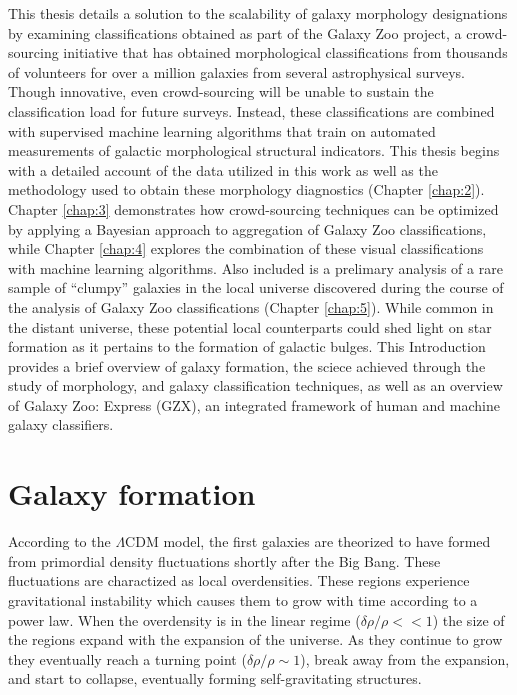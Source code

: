 This thesis details a solution to the scalability of galaxy morphology designations by examining classifications obtained as part of the Galaxy Zoo project, a crowd-sourcing initiative that has obtained morphological classifications from thousands of volunteers for over a million galaxies from several astrophysical surveys. Though innovative, even crowd-sourcing will be unable to sustain the classification load for future surveys. Instead, these classifications are combined with supervised machine learning algorithms that train on automated measurements of galactic morphological structural indicators. This thesis begins with a detailed account of the data utilized in this work as well as the methodology used to obtain these morphology diagnostics (Chapter \ref{chap:2}). Chapter \ref{chap:3} demonstrates how crowd-sourcing techniques can be optimized by applying a Bayesian approach to aggregation of Galaxy Zoo classifications, while Chapter \ref{chap:4} explores the combination of these visual classifications with machine learning algorithms. Also included is a prelimary analysis of a rare sample of ``clumpy'' galaxies in the local universe discovered during the course of the analysis of Galaxy Zoo classifications (Chapter \ref{chap:5}). While common in the distant universe, these potential local counterparts could shed light on star formation as it pertains to the formation of galactic bulges. This Introduction provides a brief overview of galaxy formation, the sciece achieved through the study of morphology, and galaxy classification techniques, as well as an overview of Galaxy Zoo: Express (GZX), an integrated framework of human and machine galaxy classifiers. 


\section{Galaxy formation}
According to the $\Lambda$CDM model, the first galaxies are theorized to have formed from primordial density fluctuations shortly after the Big Bang. These fluctuations are charactized as local overdensities. These regions experience gravitational instability which causes them to grow with time according to a power law. When the overdensity is in the linear regime ($\delta\rho/\rho <<1$) the size of the regions expand with the expansion of the universe. As they continue to grow they eventually reach a turning point ($\delta\rho/\rho\sim1$), break away from the expansion, and start to collapse, eventually forming self-gravitating structures. 

